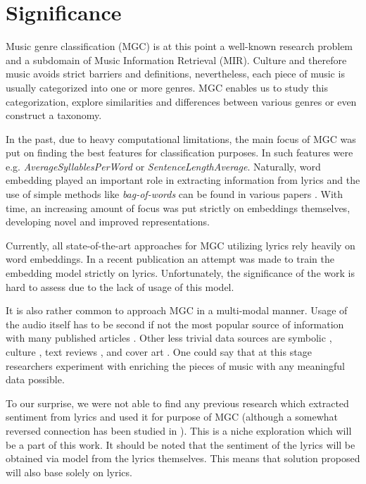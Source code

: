 \section{Significance}

Music genre classification (MGC) is at this point a well-known research problem and a subdomain of Music Information Retrieval (MIR). Culture and therefore music avoids strict barriers and definitions, nevertheless, each piece of music is usually categorized into one or more genres. MGC enables us to study this categorization, explore similarities and differences between various genres or even construct a taxonomy. 

In the past, due to heavy computational limitations, the main focus of MGC was put on finding the best features for classification purposes. In \cite{oldFeatures} such features were e.g. \textit{AverageSyllablesPerWord} or \textit{SentenceLengthAverage}. Naturally, word embedding played an important role in extracting information from lyrics and the use of simple methods like \textit{bag-of-words} can be found in various papers \cite{mgc_example_1, liang2011music}. With time, an increasing amount of focus was put strictly on embeddings themselves, developing novel and improved representations. 

Currently, all state-of-the-art approaches for MGC utilizing lyrics rely heavily on word embeddings. In a recent publication \cite{musicWordEmbed} an attempt was made to train the embedding model strictly on lyrics. Unfortunately, the significance of the work is hard to assess due to the lack of usage of this model.

It is also rather common to approach MGC in a multi-modal manner. Usage of the audio itself has to be second if not the most popular source of information with many published articles \cite{audio_1dcnn, audio_attention, audio_reviews_cover, oldFeatures, oldAudio}. Other less trivial data sources are symbolic \cite{symbolic}, culture \cite{oldFeatures}, text reviews \cite{audio_reviews_cover}, and cover art \cite{audio_reviews_cover}. One could say that at this stage researchers experiment with enriching the pieces of music with any meaningful data possible.

To our surprise, we were not able to find any previous research which extracted sentiment from lyrics and used it for purpose of MGC (although a somewhat reversed connection has been studied in \cite{gen2emo}). This is a niche exploration which will be a part of this work. It should be noted that the sentiment of the lyrics will be obtained via model from the lyrics themselves. This means that solution proposed will also base solely on lyrics. 

